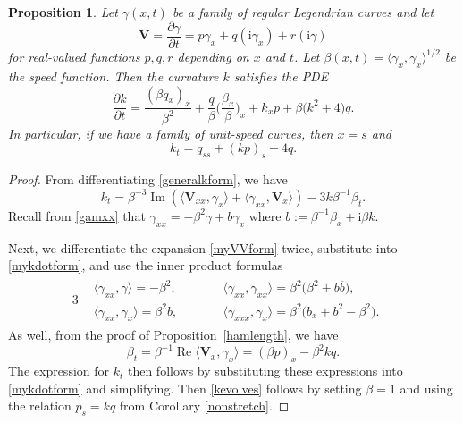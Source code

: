 \documentclass[pdftex]{sigma}
\newcommand\kk{k} %
\newcommand\speed{\beta} %
\def\ri{\mathrm{i}}
\newcommand\VV{\mathbf V}
\def\gam{\gamma} %
\def\di{\partial}
\renewcommand\Re{\operatorname{Re}}
\renewcommand\Im{\operatorname{Im}}
\numberwithin{equation}{section}
\newtheorem{Proposition}[Theorem]{Proposition}
 { \theoremstyle{definition}
\newtheorem{Definition}[Theorem]{Definition}
\newtheorem{Note}[Theorem]{Note}
\newtheorem{Example}[Theorem]{Example}
\newtheorem{Remark}[Theorem]{Remark} }
\begin{document}
\begin{Proposition}\label{kdeforms}
Let $\gam(x,t)$ be a family of regular Legendrian curves and let
\begin{equation}\label{myVVform}
\VV = \dfrac{\di \gam}{\di t} = p\gam_x + q (\ri\gam_x) + r (\ri \gam)
\end{equation}
for real-valued functions $p,q,r$ depending on $x$ and $t$. Let $\speed(x,t) = \langle \gam_x, \gam_x \rangle^{1/2}$ be the speed function.
Then the curvature $\kk$ satisfies the PDE
\begin{equation}\label{kevolvegen}
\dfrac{\di \kk}{\di t} = \dfrac{(\speed q_x)_x}{\speed^2}
+ \dfrac{q}{\speed}\biggl( \dfrac{\speed_x}{\speed}\biggr)_x
+ \kk_x p + \speed \bigl(\kk^2 + 4\bigr) q.
\end{equation}
In particular, if we have a family of unit-speed curves, then $x=s$ and
\begin{equation}\label{kevolves}
\kk_t = q_{ss} + (\kk p)_s + 4q.
\end{equation}
\end{Proposition}
\begin{proof}
From differentiating \eqref{generalkform}, we have
\begin{equation}\label{mykdotform}
\kk_t = \speed^{-3} \Im\left( \langle \VV_{xx}, \gam_x\rangle + \langle \gam_{xx}, \VV_x\rangle\right)
- 3\kk\speed^{-1} \speed_t.
\end{equation}
Recall from \eqref{gamxx} that $\gam_{xx} = - \speed^2 \gam + b \gam_x$ where $b:= \speed^{-1} \speed_x + \ri \speed \kk$.

Next, we differentiate the expansion \eqref{myVVform} twice, substitute into \eqref{mykdotform}, and use the
inner product formulas
\begin{alignat*}{3}
\begin{aligned}
&\langle \gam_{xx},\gam\rangle= -\speed^2, && \langle \gam_{xx}, \gam_{xx}\rangle= \speed^2 \bigl(\speed^2 + b \overline{b}\bigr),&\\
&\langle \gam_{xx}, \gam_x\rangle= \speed^2 b, \qquad && \langle \gam_{xxx}, \gam_x \rangle= \speed^2 \bigl(b_x + b^2 - \speed^2\bigr).&
\end{aligned}
\end{alignat*}
As well, from the proof of Proposition~\ref{hamlength}, we have
\begin{equation}\label{betadotsecond}
\speed_t = \speed^{-1}\Re \langle \VV_x, \gam_x\rangle = (\speed p)_x - \speed^2 k q.
\end{equation}
The expression for $\kk_t$ then follows by substituting these expressions into \eqref{mykdotform} and simplifying. Then \eqref{kevolves} follows by setting $\speed=1$ and using the relation $p_s = \kk q$ from Corollary
\ref{nonstretch}.
\end{proof}
\end{document}
